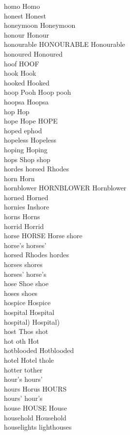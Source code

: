 homo Homo\\
honest Honest\\
honeymoon Honeymoon\\
honour Honour\\
honourable HONOURABLE Honourable\\
honoured Honoured\\
hoof HOOF\\
hook Hook\\
hooked Hooked\\
hoop Pooh Hoop pooh\\
hoopsa Hoopsa\\
hop Hop\\
hope Hope HOPE\\
hoped ephod\\
hopeless Hopeless\\
hoping Hoping\\
hops Shop shop\\
hordes horsed Rhodes\\
horn Horn\\
hornblower HORNBLOWER Hornblower\\
horned Horned\\
hornies Inshore\\
horns Horns\\
horrid Horrid\\
horse HORSE Horse shore\\
horse's horses'\\
horsed Rhodes hordes\\
horses shores\\
horses' horse's\\
hose Shoe shoe\\
hoses shoes\\
hospice Hospice\\
hospital Hospital\\
hospital) Hospital)\\
host Thos shot\\
hot oth Hot\\
hotblooded Hotblooded\\
hotel Hotel thole\\
hotter tother\\
hour's hours'\\
hours Horus HOURS\\
hours' hour's\\
house HOUSE House\\
household Household\\
houselights lighthouses\\
